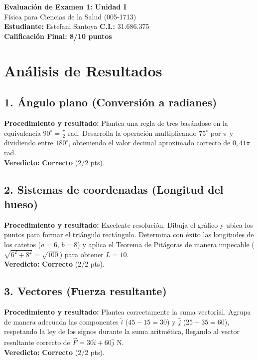 \documentclass[12pt]{article}
\begin{document}
\begin{center}
    \Large \textbf{Evaluación de Examen 1: Unidad I} \\
    \large Física para Ciencias de la Salud (005-1713) \\
    \vspace{0.5cm}
    \textbf{Estudiante:} Estefani Santoya \quad \textbf{C.I.:} 31.686.375
    \vspace{0.3cm} \\
    \large \textbf{Calificación Final: 8/10 puntos}
\end{center}

\vspace{0.5cm}

\section*{Análisis de Resultados}

\subsection*{1. Ángulo plano (Conversión a radianes)}
\textbf{Procedimiento y resultado:} Plantea una regla de tres basándose en la equivalencia $90^\circ = \frac{\pi}{2}$ rad. Desarrolla la operación multiplicando $75^\circ$ por $\pi$ y dividiendo entre $180^\circ$, obteniendo el valor decimal aproximado correcto de $0,41\pi$ rad. \\
\textbf{Veredicto:} \textbf{Correcto} (2/2 pts).

\subsection*{2. Sistemas de coordenadas (Longitud del hueso)}
\textbf{Procedimiento y resultado:} Excelente resolución. Dibuja el gráfico y ubica los puntos para formar el triángulo rectángulo. Determina con éxito las longitudes de los catetos ($a=6$, $b=8$) y aplica el Teorema de Pitágoras de manera impecable ($\sqrt{6^2 + 8^2} = \sqrt{100}$) para obtener $L = 10$. \\
\textbf{Veredicto:} \textbf{Correcto} (2/2 pts).

\subsection*{3. Vectores (Fuerza resultante)}
\textbf{Procedimiento y resultado:} Plantea correctamente la suma vectorial. Agrupa de manera adecuada las componentes $\hat{i}$ ($45 - 15 = 30$) y $\hat{j}$ ($25 + 35 = 60$), respetando la ley de los signos durante la suma aritmética, llegando al vector resultante correcto de $\vec{F} = 30\hat{i} + 60\hat{j}$ N. \\
\textbf{Veredicto:} \textbf{Correcto} (2/2 pts).
\end{document}
